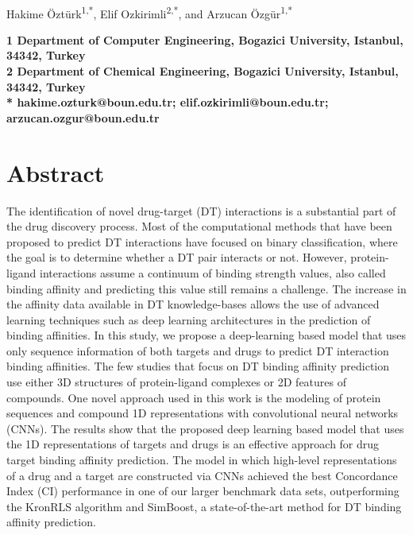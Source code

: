 \documentclass[11pt,letterpaper]{article}
\begin{document}
\vspace*{0.35in}

\begin{flushleft}
{\Large
\textbf{}
}
\newline
\\
Hakime \"{O}zt\"{u}rk\textsuperscript{1,*},
Elif Ozkirimli\textsuperscript{2,*},
and Arzucan \"{O}zg\"{u}r\textsuperscript{1,*}

\bigskip
\bf{1} Department of Computer Engineering, Bogazici University, Istanbul, 34342, Turkey
\\
\bf{2} Department of Chemical Engineering, Bogazici University, Istanbul, 34342, Turkey
\\
\bigskip
* hakime.ozturk@boun.edu.tr; elif.ozkirimli@boun.edu.tr; arzucan.ozgur@boun.edu.tr

\end{flushleft}
\justify
\section*{Abstract}
The identification of novel drug-target (DT) interactions is a substantial part of the drug discovery process. Most of the computational methods that have been proposed to predict DT interactions have focused on binary classification, where the goal is to determine whether a DT pair interacts or not. However, protein-ligand interactions assume a continuum of binding strength values, also called binding affinity and predicting this value still remains a challenge. The increase in the affinity data available in DT knowledge-bases allows the use of advanced learning techniques such as deep learning architectures in the prediction of binding affinities. 
In this study, we propose a deep-learning based model that uses only sequence information of both targets and drugs to predict DT interaction binding affinities. The few studies that focus on DT binding affinity prediction use either 3D structures of protein-ligand complexes or 2D features of compounds. One novel approach used in this work is the modeling of protein sequences and compound 1D representations with convolutional neural networks (CNNs).
The results show that the proposed deep learning based model that uses the 1D representations of targets and drugs is an effective approach for drug target binding affinity prediction. The model in which  high-level representations of a drug and a target are constructed via CNNs achieved the best Concordance Index (CI) performance in one of our larger benchmark data sets, outperforming the KronRLS algorithm and SimBoost, a  state-of-the-art method for DT binding affinity prediction.
\end{document}
